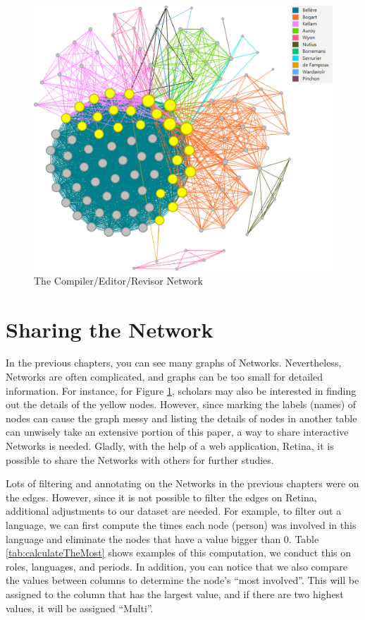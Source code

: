 \documentclass[12pt,a4paper,oneside]{book}
\begin{document}
\begin{sloppypar}
\begin{figure}[H]
\centering
\includegraphics[scale=0.6]{graph/CER Published by the Same PP.png}
\caption{The Compiler/Editor/Revisor Network}
\label{fig:CERNet}
\end{figure}

\chapter{Sharing the Network}
\label{shareNetwork}
In the previous chapters, you can see many graphs of Networks. Nevertheless, Networks are often complicated, and graphs can be too small for detailed information. For instance, for Figure \ref{fig:CERNet}, scholars may also be interested in finding out the details of the yellow nodes. However, since marking the labels (names) of nodes can cause the graph messy and listing the details of nodes in another table can unwisely take an extensive portion of this paper, a way to share interactive Networks is needed. Gladly, with the help of a web application, Retina, it is possible to share the Networks with others for further studies.

Lots of filtering and annotating on the Networks in the previous chapters were on the edges. However, since it is not possible to filter the edges on Retina, additional adjustments to our dataset are needed. For example, to filter out a language, we can first compute the times each node (person) was involved in this language and eliminate the nodes that have a value bigger than 0. Table \ref{tab:calculateTheMost} shows examples of this computation, we conduct this on roles, languages, and periods. In addition, you can notice that we also compare the values between columns to determine the node’s “most involved”. This will be assigned to the column that has the largest value, and if there are two highest values, it will be assigned “Multi”.


\end{sloppypar}
\end{document}
